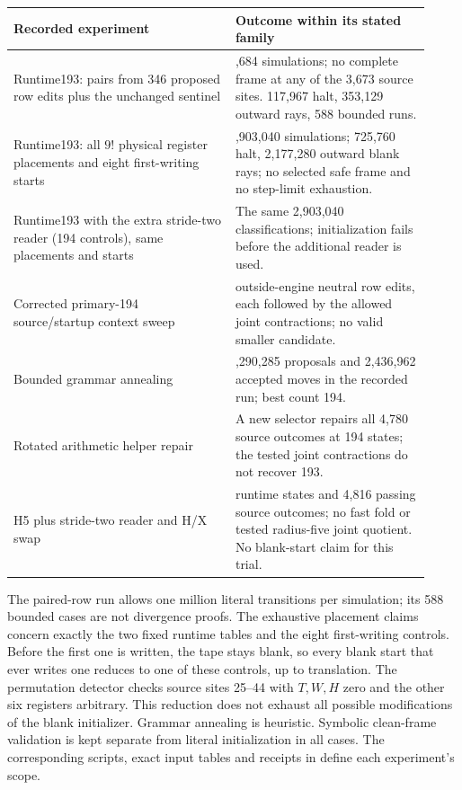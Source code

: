 \begin{center}
\begin{tabular}{@{}>{\raggedright\arraybackslash}p{0.49\linewidth}>{\raggedright\arraybackslash}p{0.43\linewidth}@{}}
\toprule
Recorded experiment & Outcome within its stated family\\
\midrule
Runtime193: pairs from 346 proposed row edits plus the unchanged sentinel &
471,684 simulations; no complete frame at any of the 3,673 source sites.
117,967 halt, 353,129 outward rays, 588 bounded runs.\\[5pt]
Runtime193: all $9!$ physical register placements and eight first-writing
starts & 2,903,040 simulations; 725,760 halt, 2,177,280 outward blank rays;
no selected safe frame and no step-limit exhaustion.\\[5pt]
Runtime193 with the extra stride-two reader (194 controls), same placements
and starts & The same 2,903,040 classifications; initialization fails
before the additional reader is used.\\[5pt]
Corrected primary-194 source/startup context sweep & 334 outside-engine
neutral row edits, each followed by the allowed joint contractions;
no valid smaller candidate.\\[5pt]
Bounded grammar annealing & 14,290,285 proposals and 2,436,962 accepted
moves in the recorded run; best count 194.\\[5pt]
Rotated arithmetic helper repair & A new selector repairs all 4,780
source outcomes at 194 states; the tested joint contractions do not
recover 193.\\
H5 plus stride-two reader and H/X swap & 195 runtime states and 4,816
passing source outcomes; no fast fold or tested radius-five joint
quotient. No blank-start claim for this trial.\\
\bottomrule
\end{tabular}
\end{center}

The paired-row run allows one million literal transitions per simulation;
its 588 bounded cases are not divergence proofs. The exhaustive placement
claims concern exactly the two fixed runtime tables and the eight
first-writing controls. Before the first one is written, the tape stays
blank, so every blank start that ever writes one reduces to one of these
controls, up to translation. The permutation detector checks source sites
25--44 with $T,W,H$ zero and the other six registers arbitrary.
This reduction does not exhaust all possible
modifications of the blank initializer. Grammar annealing is heuristic. Symbolic clean-frame
validation is kept separate from literal initialization in all cases.
The corresponding scripts, exact input tables and receipts in
 define each experiment's scope.
